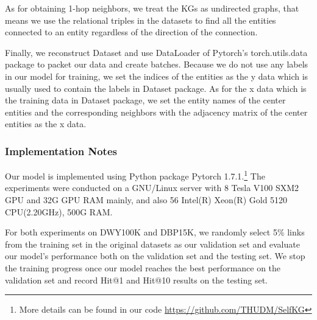As for obtaining 1-hop neighbors, we treat the KGs as undirected graphs, that means we use the relational triples in the datasets to find all the entities connected to an entity regardless of the direction of the connection.

Finally, we reconstruct Dataset and use DataLoader of Pytorch's torch.utils.data package to packet our data and create batches. Because we do not use any labels in our model for training, we set the indices of the entities as the y data which is usually used to contain the labels in Dataset package. As for the x data which is the training data in Dataset package, we set the entity names of the center entities and the corresponding neighbors with the adjacency matrix of the center entities as the x data.


\subsubsection{Implementation Notes}

Our model is implemented using Python package Pytorch 1.7.1.\footnote{More details can be found in our code \url{https://github.com/THUDM/SelfKG}}
The experiments were conducted on a GNU/Linux server with 8 Tesla V100 SXM2 GPU and 32G GPU RAM mainly, and also 56 Intel(R) Xeon(R) Gold 5120 CPU(2.20GHz), 500G RAM.







For both experiments on DWY100K and DBP15K, we randomly select 5\% links from the training set in the original datasets as our validation set and evaluate our model's performance both on the validation set and the testing set. We stop the training progress once our model reaches the best performance on the validation set and record Hit@1 and Hit@10 results on the testing set.





